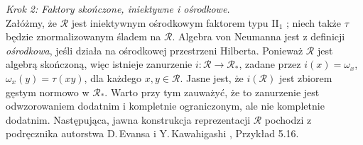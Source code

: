 {\it Krok 2: Faktory skończone, iniektywne i ośrodkowe.}\\
Załóżmy, że $\mathcal{R}$ jest iniektywnym ośrodkowym faktorem typu
II$\phantom{}_{1}$ \cite{Takesaki3};
niech także $\tau$ będzie znormalizowanym śladem na $\mathcal{R}$.
Algebra von Neumanna jest z definicji \emph{ośrodkowa},
jeśli działa na ośrodkowej przestrzeni Hilberta.
Ponieważ $\mathcal{R}$ jest algebrą skończoną, więc istnieje zanurzenie
$i: \mathcal{R} \rightarrow
\mathcal{R}_{*}$, zadane przez $i(x) = \omega_{x}$, $\omega_{x}(y) = \tau(xy)$,
dla każdego $x,y \in \mathcal{R}$.
Jasne jest, że $i(\mathcal{R})$
jest zbiorem gęstym normowo w $\mathcal{R}_{*}$.
Warto przy tym zauważyć, że to zanurzenie jest odwzorowaniem dodatnim i kompletnie
ograniczonym, ale nie kompletnie dodatnim.
Następująca, jawna konstrukcja reprezentacji $\mathcal{R}$
pochodzi z podręcznika autorstwa D.\,Evansa  i Y.\,Kawahigashi
\cite{Evans1998}, Przykład 5.16.


